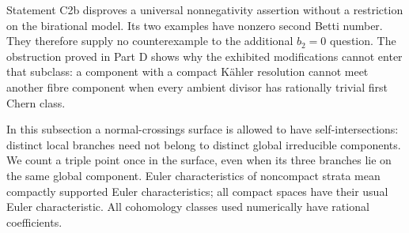 Statement C2b disproves a universal nonnegativity assertion without a restriction on the birational model. Its two examples have nonzero second Betti number. They therefore supply no counterexample to the additional $b_2=0$ question. The obstruction proved in Part D shows why the exhibited modifications cannot enter that subclass: a component with a compact K\"ahler resolution cannot meet another fibre component when every ambient divisor has rationally trivial first Chern class.



In this subsection a normal-crossings surface is allowed to have self-intersections: distinct local branches need not belong to distinct global irreducible components. We count a triple point once in the surface, even when its three branches lie on the same global component. Euler characteristics of noncompact strata mean compactly supported Euler characteristics; all compact spaces have their usual Euler characteristic. All cohomology classes used numerically have rational coefficients.


